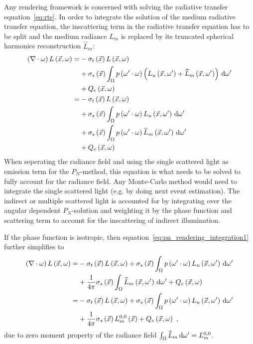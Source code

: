 Any rendering framework is concerned with solving the radiative transfer equation~\ref{eq:rte}. In order to integrate the solution of the medium radiative transfer equation, the inscattering term in the radiative transfer equation has to be split and the medium radiance $L_m$ is replaced by its truncated spherical harmonics reconstruction $\widehat{L}_m$:
\begin{align}
\left(\nabla\cdot\omega\right)L\left(\vec{x}, \omega \right)
=&
-\sigma_t\left(\vec{x}\right) L\left(\vec{x}, \omega \right)\nonumber\\
&
+\sigma_s\left(\vec{x}\right) \int_{\Omega}
{
p\left(\omega'\cdot\omega\right)\left(L_u\left(\vec{x}, \omega' \right)+\widehat{L}_m\left(\vec{x}, \omega' \right)\right)\,\mathrm{d}\omega'
}
\nonumber
\\
&
+Q_e\left(\vec{x}, \omega\right)
\nonumber
\\
=&
-\sigma_t\left(\vec{x}\right) L\left(\vec{x}, \omega \right)
\nonumber\\
&
+\sigma_s\left(\vec{x}\right) \int_{\Omega}
{
p\left(\omega'\cdot\omega\right)L_u\left(\vec{x}, \omega' \right)\,\mathrm{d}\omega'
}
\nonumber\\
&
+\sigma_s\left(\vec{x}\right) \int_{\Omega}
{
p\left(\omega'\cdot\omega\right)\widehat{L}_m\left(\vec{x}, \omega' \right)\,\mathrm{d}\omega'
}
\nonumber\\
&
+Q_e\left(\vec{x}, \omega\right)
\label{eq:pn_rendering_integration1}
\end{align}
When seperating the radiance field and using the single scattered light as emission term for the $P_N$-method, this equation is what needs to be solved to fully account for the radiance field. Any Monte-Carlo method would need to integrate the single scattered light (e.g. by doing next event estimation). The indirect or multiple scattered light is accounted for by integrating over the angular dependent $P_N$-solution and weighting it by the phase function and scattering term to account for the inscattering of indirect illumination.

If the phase function is isotropic, then equation~\ref{eq:pn_rendering_integration1} further simplifies to
\begin{align}
\left(\nabla\cdot\omega\right)L\left(\vec{x}, \omega \right)
=&
-\sigma_t\left(\vec{x}\right) L\left(\vec{x}, \omega \right)
+\sigma_s\left(\vec{x}\right) \int_{\Omega}
{
p\left(\omega'\cdot\omega\right)L_u\left(\vec{x}, \omega' \right)\,\mathrm{d}\omega'
}
\nonumber\\
&
+
\frac{1}{4\pi}
\sigma_s\left(\vec{x}\right)
\int_{\Omega}
{
\widehat{L}_m\left(\vec{x}, \omega' \right)\,\mathrm{d}\omega'
}
+Q_e\left(\vec{x}, \omega\right)
\nonumber\\
=&
-\sigma_t\left(\vec{x}\right) L\left(\vec{x}, \omega \right)
+\sigma_s\left(\vec{x}\right) \int_{\Omega}
{
p\left(\omega'\cdot\omega\right)L_u\left(\vec{x}, \omega' \right)\,\mathrm{d}\omega'
}
\nonumber\\
&
+
\frac{1}{4\pi}
\sigma_s\left(\vec{x}\right)
L_m^{0,0}\left(\vec{x}\right)
+Q_e\left(\vec{x}, \omega\right)
\ ,
\label{eq:pn_rendering_integration2}
\end{align}
due to zero moment property of the radiance field $\int_{\Omega}\widehat{L}_m\,\mathrm{d}\omega'=L_m^{0,0}$.

